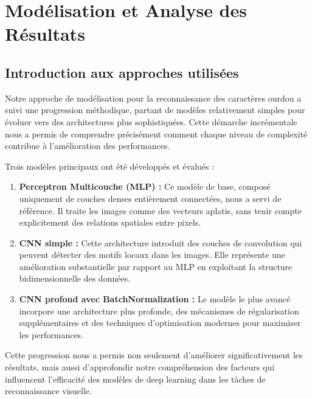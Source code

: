 
\chapter{Modélisation et Analyse des Résultats}

\section{Introduction aux approches utilisées}

\begin{flushleft}
Notre approche de modélisation pour la reconnaissance des caractères ourdou a suivi une progression méthodique, partant de modèles relativement simples pour évoluer vers des architectures plus sophistiquées. Cette démarche incrémentale nous a permis de comprendre précisément comment chaque niveau de complexité contribue à l'amélioration des performances.

Trois modèles principaux ont été développés et évalués :



\begin{enumerate}
\item \textbf{Perceptron Multicouche (MLP) :} Ce modèle de base, composé uniquement de couches denses entièrement connectées, nous a servi de référence. Il traite les images comme des vecteurs aplatis, sans tenir compte explicitement des relations spatiales entre pixels.
\item \textbf{CNN simple :} Cette architecture introduit des couches de convolution qui peuvent détecter des motifs locaux dans les images. Elle représente une amélioration substantielle par rapport au MLP en exploitant la structure bidimensionnelle des données.

\item \textbf{CNN profond avec BatchNormalization :}  Le modèle le plus avancé incorpore une architecture plus profonde, des mécanismes de régularisation supplémentaires et des techniques d'optimisation modernes pour maximiser les performances. 
\end{enumerate}

Cette progression nous a permis non seulement d'améliorer significativement les résultats, mais aussi d'approfondir notre compréhension des facteurs qui influencent l'efficacité des modèles de deep learning dans les tâches de reconnaissance visuelle.
\end{flushleft}

